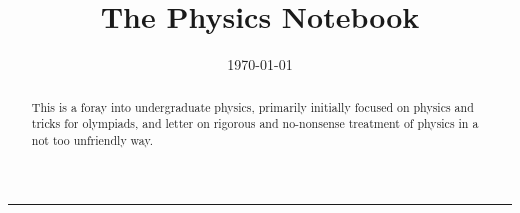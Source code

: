 \documentclass[twoside, a4paper, 10pt]{memoir}
\date{\today}
\title{The Physics Notebook}
\begin{document}

\begin{titlingpage}
    \BgThispage
    \vspace*{0.4\textheight}
    \noindent
    \textcolor{white}{\Huge\textbf{\textsf{\thetitle}}}
    \vspace*{2cm}\par
    \noindent
    \begin{minipage}{0.35\linewidth}
        \begin{flushright}
            {\printauthor}
        \end{flushright}
    \end{minipage} \hspace{15pt}
    \begin{minipage}{0.02\linewidth}
        \rule{1pt}{175pt}
    \end{minipage} \hspace{-10pt}
    \begin{minipage}{0.6\linewidth}
    \vspace{5pt}
        \begin{abstract} 
     This is a foray into undergraduate physics, primarily initially focused on physics and tricks for olympiads, and letter on rigorous and no-nonsense treatment of physics in a not too unfriendly way.
        \end{abstract}
    \end{minipage}
\end{titlingpage}
    \restoregeometry

    \frontmatter
    \renewcommand*{\contentsname}{Short contents}
    \setcounter{tocdepth}{0}%
    \tableofcontents

    \clearpage
    \renewcommand*{\contentsname}{Contents}
    \setcounter{tocdepth}{1}%
    \tableofcontents
    \clearpage
    \listoffigures
    \restoregeometry

    \mainmatter

    \setcounter{chapter}{0}
    
    


    


    \appendix
    
    \backmatter
    \printindex
\end{document}
